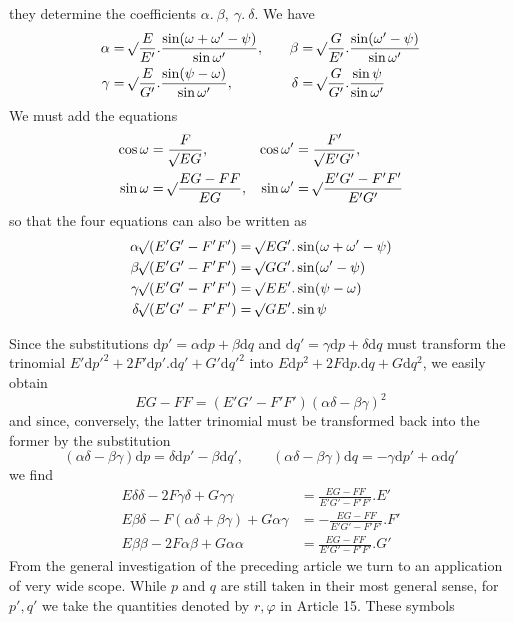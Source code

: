 %
they determine the coefficients \(\alpha\mathord{.}\ \beta,\ \gamma\mathord{.}\ \delta\). We have
\[
\begin{aligned}
\alpha&=\mathord{{}^{}\!\surd}\frac{E}{E'}\mathord{.}\frac{\sin(\omega+\omega'-\psi)}{\sin\omega'},&\quad\beta&=\mathord{{}^{}\!\surd}\frac{G}{E'}\mathord{.}\frac{\sin(\omega'-\psi)}{\sin\omega'}\\
\gamma&=\mathord{{}^{}\!\surd}\frac{E}{G'}\mathord{.}\frac{\sin(\psi-\omega)}{\sin\omega'},&\delta&=\mathord{{}^{}\!\surd}\frac{G}{G'}\mathord{.}\frac{\sin\psi}{\sin\omega'}
\end{aligned}
\]
We must add the equations
\[
\begin{aligned}
\cos\omega&=\frac{F}{\mathord{{}^{}\!\surd}EG},&\cos\omega'&=\frac{F'}{\mathord{{}^{}\!\surd}E'G'},\\
\sin\omega&=\mathord{{}^{}\!\surd}\frac{EG-FF}{EG},&\sin\omega'&=\mathord{{}^{}\!\surd}\frac{E'G'-F'F'}{E'G'}
\end{aligned}
\]
so that the four equations can also be written as
\[
\begin{aligned}
\alpha\BareRoot{(E'G'-F'F')}&=\BareRoot{EG'}\mathord{.}\sin(\omega+\omega'-\psi)\\
\beta\BareRoot{(E'G'-F'F')}&=\BareRoot{GG'}\mathord{.}\sin(\omega'-\psi)\\
\gamma\BareRoot{(E'G'-F'F')}&=\BareRoot{EE'}\mathord{.}\sin(\psi-\omega)\\
\delta\BareRoot{(E'G'-F'F')}&=\BareRoot{GE'}\mathord{.}\sin\psi
\end{aligned}
\]

Since the substitutions \(\mathrm{d}p'=\alpha\mathrm{d}p+\beta\mathrm{d}q\) and \(\mathrm{d}q'=\gamma\mathrm{d}p+\delta\mathrm{d}q\) must transform the trinomial \(E'\mathrm{d}p'^2+2F'\mathrm{d}p'\mathord{.}\mathrm{d}q'+G'\mathrm{d}q'^2\) into \(E\mathrm{d}p^2+2F\mathrm{d}p\mathord{.}\mathrm{d}q+G\mathrm{d}q^2\), we easily obtain
\[
EG-FF=(E'G'-F'F')(\alpha\delta-\beta\gamma)^2
\]
and since, conversely, the latter trinomial must be transformed back into the former by the substitution
\[
(\alpha\delta-\beta\gamma)\mathrm{d}p=\delta\mathrm{d}p'-\beta\mathrm{d}q',\qquad(\alpha\delta-\beta\gamma)\mathrm{d}q=-\gamma\mathrm{d}p'+\alpha\mathrm{d}q'
\]
we find
\[
\begin{aligned}
E\delta\delta-2F\gamma\delta+G\gamma\gamma&=\frac{EG-FF}{E'G'-F'F'}\mathord{.}E'\\
E\beta\delta-F(\alpha\delta+\beta\gamma)+G\alpha\gamma&=-\frac{EG-FF}{E'G'-F'F'}\mathord{.}F'\\
E\beta\beta-2F\alpha\beta+G\alpha\alpha&=\frac{EG-FF}{E'G'-F'F'}\mathord{.}G'
\end{aligned}
\]
From the general investigation of the preceding article we turn to an application of very wide scope. While \(p\) and \(q\) are still taken in their most general sense, for \(p',q'\) we take the quantities denoted by \(r,\varphi\) in Article 15. These symbols
